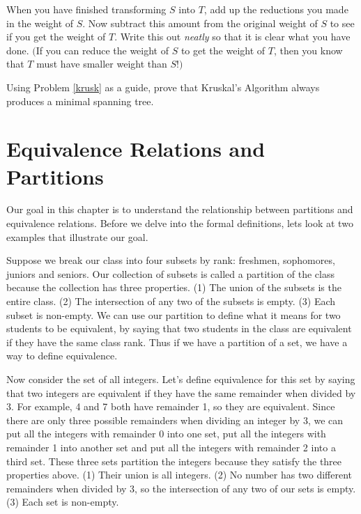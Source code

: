 When you have finished transforming $S$ into $T$, add up the reductions you made in the weight of $S$.  Now subtract this amount from the original weight of $S$ to see if you get the weight of $T$. Write this out {\em neatly} so that it is clear what you have done. $($If you can reduce the weight of $S$ to get the weight of $T$, then you know that $T$ must have smaller weight than $S$!$)$

\begin{prb}
Using Problem \ref{krusk} as a guide, prove that Kruskal's Algorithm always produces a minimal spanning tree.
\end{prb}




\chapter{Equivalence Relations and Partitions}

Our goal in this chapter is to understand the relationship between partitions and equivalence relations.  Before we delve into the formal definitions, lets look at two examples that illustrate our goal.

Suppose we break our class into four subsets by rank: freshmen, sophomores, juniors and seniors. Our collection of subsets is called a partition of the class because the collection has three properties.  (1) The union of the subsets is the entire class.  (2) The intersection of any two of the subsets is empty.  (3) Each subset is non-empty.  We can use our partition to define what it means for two students to be equivalent, by saying that two students in the class are equivalent if they have the same class rank.  Thus if we have a partition of a set, we have a way to define equivalence.

Now consider the set of all integers.  Let's define equivalence for this set by saying that two integers are equivalent if they have the same remainder when divided by 3.  For example, 4 and 7 both have remainder 1, so they are equivalent.  Since there are only three possible remainders when dividing an integer by 3, we can put all the integers with remainder 0 into one set, put all the integers with remainder 1 into another set and put all the integers with remainder 2 into a third set.  These three sets partition the integers because they satisfy the three properties above. (1) Their union is all integers. (2) No number has two different remainders when divided by 3, so the intersection of any two of our sets is empty. (3)  Each set is non-empty.

